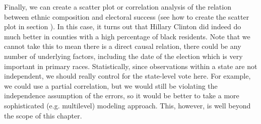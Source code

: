 Finally, we can create a scatter plot or correlation analysis of the relation between ethnic composition and electoral success (see how to create the scatter plot in section ).
In this case, it turns out that Hillary Clinton did indeed do much better in counties with a high percentage of black residents.
Note that we cannot take this to mean there is a direct causal relation, there could be any number of underlying factors, including the date of the election which is very important in primary races.
Statistically, since observations within a state are not independent, we should really control for the state-level vote here.
For example, we could use a partial correlation, but we would still be violating the independence assumption of the errors,
so it would be better to take a more sophisticated (e.g. multilevel) modeling approach. This, however, is well beyond the scope
of this chapter. 

